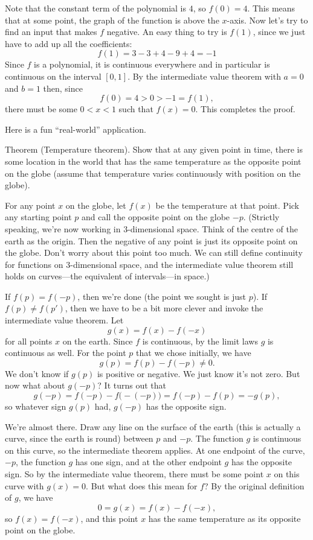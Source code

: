 Note that the constant term of the polynomial is $4$, so $f(0) = 4$. This means that at some point, the
graph of the function is above the $x$-axis. Now let's try to find an input that makes $f$ negative. An
easy thing to try is $f(1)$, since we just have to add up all the coefficients:
$$f(1) = 3 - 3 + 4 - 9 + 4 = -1$$
Since $f$ is a polynomial, it is continuous everywhere and in particular is continuous on the interval
$[0,1]$. By the intermediate value theorem with $a=0$ and $b=1$ then, since
$$f(0) = 4 > 0 > -1 = f(1),$$
there must be some $0 < x < 1$ such that $f(x) = 0$. This completes the proof.\slug

Here is a fun ``real-world'' application.

\edef\thmtemp{\the\thmcount}
\parenproclaim Theorem {\advthm} (Temperature theorem).
Show that at any given point in time, there is some location in the world
that has the same temperature as the opposite point on the globe (assume that temperature varies
continuously with position on the globe).

\proof For any point $x$ on the globe, let $f(x)$ be the temperature at that point. Pick any starting point
$p$ and call the opposite point on the globe $-p$. (Strictly speaking, we're now working in $3$-dimensional
space. Think of the centre of the earth as the origin. Then the negative of any point is just its opposite
point on the globe. Don't worry about this point too much. We can still define continuity for functions
on $3$-dimensional space, and the intermediate value theorem still holds on
curves---the equivalent of intervals---in space.)

If $f(p) = f(-p)$, then we're done (the point we sought is just $p$).
If $f(p)\ne f(p')$, then we have to be a bit more clever and invoke the intermediate value theorem.
Let
$$g(x) = f(x) - f(-x)$$
for all points $x$ on the earth. Since $f$ is continuous, by the limit laws $g$ is continuous as well.
For the point $p$ that we chose initially, we have
$$g(p) = f(p) - f(-p) \ne 0.$$
We don't know if $g(p)$ is positive or negative. We just know it's not zero. But now what about $g(-p)$?
It turns out that
$$g(-p) = f(-p) - f\bigl(-(-p)\bigr) = f(-p) - f(p) = -g(p),$$
so whatever sign $g(p)$ had, $g(-p)$ has the opposite sign.

We're almost there. Draw any line on the surface of the earth (this is actually a curve, since the earth
is round)
between $p$ and $-p$. The function $g$ is continuous on this curve, so the intermediate theorem applies.
At one endpoint of the curve, $-p$, the function $g$ has one sign, and at the other endpoint $g$ has
the opposite sign. So by the intermediate value theorem, there must be some point $x$ on this curve
with $g(x) = 0$. But what does this mean for $f$? By the original definition of $g$, we have
$$0 = g(x) = f(x) - f(-x),$$
so $f(x) = f(-x)$, and this point $x$ has the same temperature as its opposite point on the globe.\slug

